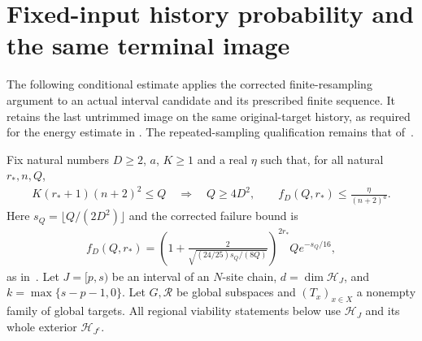 \section{Fixed-input history probability and the same terminal image}

The following conditional estimate applies the corrected finite-resampling
argument to an actual interval candidate and its prescribed finite sequence.
It retains the last untrimmed image on the same original-target history,
as required for the energy estimate in
\cite[lines 1801--1813]{Arad2016RigorousRG}. The repeated-sampling
qualification remains that of~\cite{gap:alvv16_bootstrap_constants}.

\begin{lemma}
    \label{lem:fixed_interval_raw_history_probability}
    \leanok
    Fix natural numbers $D\ge2$, $a$, $K\ge1$ and a real $\eta$ such that,
    for all natural $r_*,n,Q$,
    \begin{align}
        K(r_*+1)(n+2)^2\le Q\quad\Longrightarrow\quad
        Q\ge4D^2,\qquad f_D(Q,r_*)\le\frac{\eta}{(n+2)^a}.
        \label{eq:fixed_interval_scalar_threshold}
    \end{align}
    Here $s_Q=\lfloor Q/(2D^2)\rfloor$ and the corrected failure bound is
    \begin{align}
        f_D(Q,r_*)=
        \left(1+\frac{2}{\sqrt{(24/25)s_Q/(8Q)}}\right)^{2r_*}
        Qe^{-s_Q/16},
        \label{eq:fixed_interval_bootstrap_failure}
    \end{align}
    as in~\cite{gap:alvv16_random_sampling_net_count}.
    Let $J=[p,s)$ be an interval of an $N$-site chain, $d=\dim\mathcal H_J$,
    and $k=\max\{s-p-1,0\}$. Let $G,\mathcal R$ be global subspaces and
    $(T_x)_{x\in X}$ a nonempty family of global targets.
    All regional viability statements below use $\mathcal H_J$ and its
    whole exterior $\mathcal H_{J^c}$.


\end{lemma}
